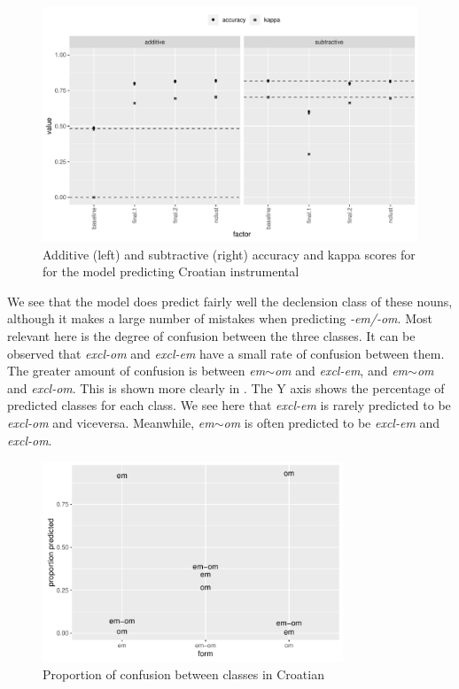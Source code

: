 \begin{figure}
  \centering
  \includegraphics[width=1.0\textwidth]{./figures/croatian/factimp-plot.pdf}
    \caption{Additive (left) and subtractive (right) accuracy and kappa scores for for the model predicting Croatian instrumental}\label{fig:factimp-plot-croatian}
\end{figure}

We see that the model does predict fairly well the declension class of these nouns, although it makes a large number of mistakes when predicting \textit{-em/-om}. Most relevant here is the degree of confusion between the three classes. It can be observed that \textit{excl-om} and \textit{excl-em} have a small rate of confusion between them. The greater amount of confusion is between \textit{em}$\sim$\textit{om} and \textit{excl-em}, and \textit{em}$\sim$\textit{om} and \textit{excl-om}. This is shown more clearly in . The Y axis shows the percentage of predicted classes for each class. We see here that  \textit{excl-em} is rarely predicted to be  \textit{excl-om} and viceversa. Meanwhile, \textit{em}$\sim$\textit{om} is often predicted to be \textit{excl-em} and \textit{excl-om}.

\begin{figure}
  \centering
  \includegraphics[width=0.8\textwidth]{./figures/croatian/croatian.pdf}
  \caption{Proportion of confusion between classes in Croatian}\label{fig:croatian-results}
\end{figure}

